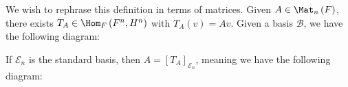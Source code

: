 \documentclass[10pt]{mypackage}
\begin{document}
We wish to rephrase this definition in terms of matrices. Given $A\in \Mat_{n}\left(F\right)$, there exists $T_A\in \Hom_{F}\left(F^n,H^n\right)$ with $T_A(v) = Av$. Given a basis $\mathcal{B}$, we have the following diagram:
\begin{center}
\end{center}
If $\mathcal{E}_n$ is the standard basis, then $A = \left[T_{A}\right]_{\mathcal{E}_n}$, meaning we have the following diagram:
\begin{center}
\end{center}
\end{document}
